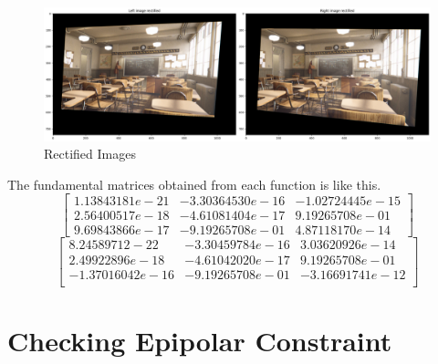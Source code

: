 \begin{figure}[h]
    \centering
    \includegraphics[width=12cm]{../result/rectified_imgs_result.png}
    \caption{Rectified Images}
    \label{fig:result1}
\end{figure}
The fundamental matrices obtained from each function is like this.
$$ \left[
\begin{matrix}
    1.13843181e-21 & -3.30364530e-16 & -1.02724445e-15\\
    2.56400517e-18 & -4.61081404e-17 & 9.19265708e-01\\
    9.69843866e-17 & -9.19265708e-01 & 4.87118170e-14
\end{matrix}
\right] $$
$$ \left[
\begin{matrix}
    8.24589712-22 & -3.30459784e-16 & 3.03620926e-14\\
    2.49922896e-18 & -4.61042020e-17 & 9.19265708e-01\\
    -1.37016042e-16 & -9.19265708e-01 & -3.16691741e-12\\
\end{matrix}
\right] $$
\section*{Checking Epipolar Constraint}
